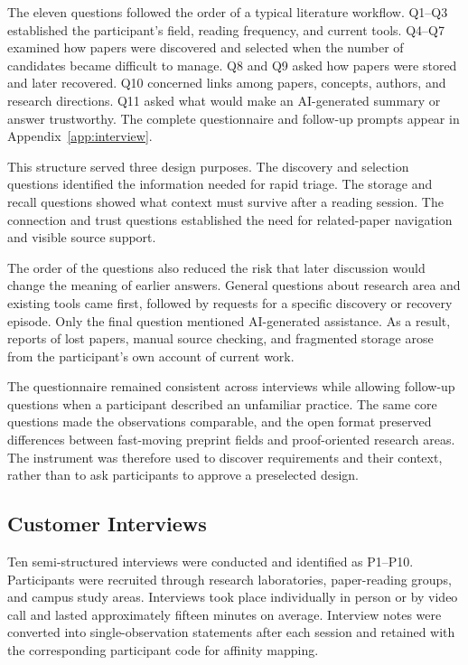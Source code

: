 The eleven questions followed the order of a typical literature workflow.
Q1--Q3 established the participant's field, reading frequency, and current
tools.  Q4--Q7 examined how papers were discovered and selected when the number
of candidates became difficult to manage.  Q8 and Q9 asked how papers were
stored and later recovered.  Q10 concerned links among papers, concepts,
authors, and research directions.  Q11 asked what would make an AI-generated
summary or answer trustworthy.  The complete questionnaire and follow-up
prompts appear in Appendix~\ref{app:interview}.

This structure served three design purposes.  The discovery and selection
questions identified the information needed for rapid triage.  The storage and
recall questions showed what context must survive after a reading session.
The connection and trust questions established the need for related-paper
navigation and visible source support.

The order of the questions also reduced the risk that later discussion would
change the meaning of earlier answers.  General questions about research area
and existing tools came first, followed by requests for a specific discovery
or recovery episode.  Only the final question mentioned AI-generated
assistance.  As a result, reports of lost papers, manual source checking, and
fragmented storage arose from the participant's own account of current work.

The questionnaire remained consistent across interviews while allowing
follow-up questions when a participant described an unfamiliar practice.  The
same core questions made the observations comparable, and the open format
preserved differences between fast-moving preprint fields and
proof-oriented research areas.  The instrument was therefore used to discover
requirements and their context, rather than to ask participants to approve a
preselected design.

\subsection{Customer Interviews}

Ten semi-structured interviews were conducted and identified as P1--P10.
Participants were recruited through research laboratories, paper-reading
groups, and campus study areas.  Interviews took place individually in person
or by video call and lasted approximately fifteen minutes on average.
Interview notes were converted into single-observation statements after each
session and retained with the corresponding participant code for affinity
mapping.

